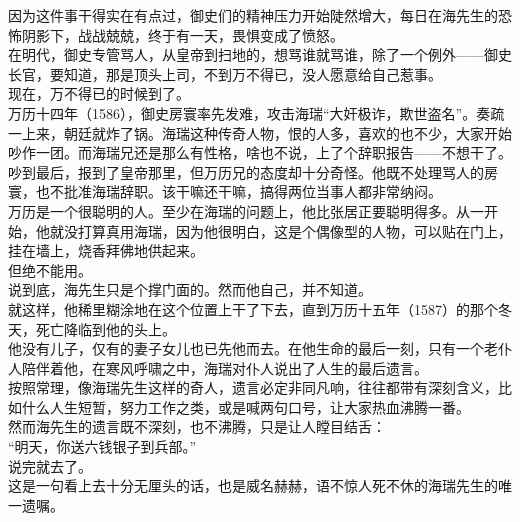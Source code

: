 \begin{multicols}{\theparacolNo}
因为这件事干得实在有点过，御史们的精神压力开始陡然增大，每日在海先生的恐怖阴影下，战战兢兢，终于有一天，畏惧变成了愤怒。\\

在明代，御史专管骂人，从皇帝到扫地的，想骂谁就骂谁，除了一个例外——御史长官，要知道，那是顶头上司，不到万不得已，没人愿意给自己惹事。\\

现在，万不得已的时候到了。\\

万历十四年（1586），御史房寰率先发难，攻击海瑞“大奸极诈，欺世盗名”。奏疏一上来，朝廷就炸了锅。海瑞这种传奇人物，恨的人多，喜欢的也不少，大家开始吵作一团。而海瑞兄还是那么有性格，啥也不说，上了个辞职报告——不想干了。\\

吵到最后，报到了皇帝那里，但万历兄的态度却十分奇怪。他既不处理骂人的房寰，也不批准海瑞辞职。该干嘛还干嘛，搞得两位当事人都非常纳闷。\\

万历是一个很聪明的人。至少在海瑞的问题上，他比张居正要聪明得多。从一开始，他就没打算真用海瑞，因为他很明白，这是个偶像型的人物，可以贴在门上，挂在墙上，烧香拜佛地供起来。\\

但绝不能用。\\

说到底，海先生只是个撑门面的。然而他自己，并不知道。\\

就这样，他稀里糊涂地在这个位置上干了下去，直到万历十五年（1587）的那个冬天，死亡降临到他的头上。\\

他没有儿子，仅有的妻子女儿也已先他而去。在他生命的最后一刻，只有一个老仆人陪伴着他，在寒风呼啸之中，海瑞对仆人说出了人生的最后遗言。\\

按照常理，像海瑞先生这样的奇人，遗言必定非同凡响，往往都带有深刻含义，比如什么人生短暂，努力工作之类，或是喊两句口号，让大家热血沸腾一番。\\

然而海先生的遗言既不深刻，也不沸腾，只是让人瞠目结舌：\\

“明天，你送六钱银子到兵部。”\\

说完就去了。\\

这是一句看上去十分无厘头的话，也是威名赫赫，语不惊人死不休的海瑞先生的唯一遗嘱。\\


\end{multicols}
